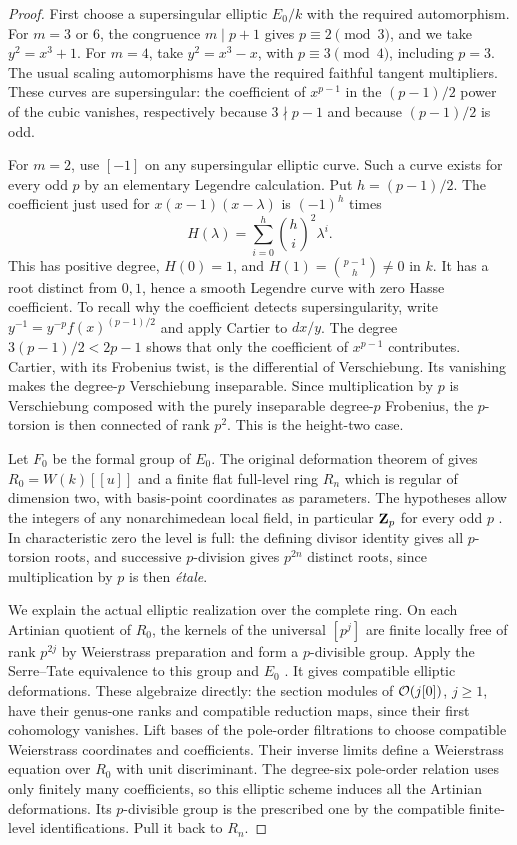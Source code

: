 \begin{proof}
First choose a supersingular elliptic $E_0/k$ with the required automorphism. For $m=3$ or $6$, the congruence $m\mid p+1$ gives $p\equiv2\pmod3$, and we take $y^2=x^3+1$. For $m=4$, take $y^2=x^3-x$, with $p\equiv3\pmod4$, including $p=3$. The usual scaling automorphisms have the required faithful tangent multipliers. These curves are supersingular: the coefficient of $x^{p-1}$ in the $(p-1)/2$ power of the cubic vanishes, respectively because $3\nmid p-1$ and because $(p-1)/2$ is odd.

For $m=2$, use $[-1]$ on any supersingular elliptic curve. Such a curve exists for every odd $p$ by an elementary Legendre calculation. Put $h=(p-1)/2$. The coefficient just used for $x(x-1)(x-\lambda)$ is $(-1)^h$ times
\[
 H(\lambda)=\sum_{i=0}^h\binom hi^2\lambda^i.
\]
This has positive degree, $H(0)=1$, and
$H(1)=\binom{p-1}{h}\ne0$ in $k$. It has a root distinct from $0,1$, hence a smooth Legendre curve with zero Hasse coefficient. To recall why the coefficient detects supersingularity, write
$y^{-1}=y^{-p}f(x)^{(p-1)/2}$ and apply Cartier to $dx/y$. The degree $3(p-1)/2<2p-1$ shows that only the coefficient of $x^{p-1}$ contributes. Cartier, with its Frobenius twist, is the differential of Verschiebung. Its vanishing makes the degree-$p$ Verschiebung inseparable. Since multiplication by $p$ is Verschiebung composed with the purely inseparable degree-$p$ Frobenius, the $p$-torsion is then connected of rank $p^2$. This is the height-two case.

Let $F_0$ be the formal group of $E_0$. The original deformation theorem of \citet[Propositions~4.2--4.3, pp.~570--573]{Drinfeld1974} gives
$R_0=W(k)[[u]]$ and a finite flat full-level ring $R_n$ which is regular of dimension two, with basis-point coordinates as parameters. The hypotheses allow the integers of any nonarchimedean local field, in particular $\mathbf Z_p$ for every odd $p$ \citep[\S1C, pp.~564--565]{Drinfeld1974}. In characteristic zero the level is full: the defining divisor identity gives all $p$-torsion roots, and successive $p$-division gives $p^{2n}$ distinct roots, since multiplication by $p$ is then \emph{\'etale}.

We explain the actual elliptic realization over the complete ring. On each Artinian quotient of $R_0$, the kernels of the universal $[p^j]$ are finite locally free of rank $p^{2j}$ by Weierstrass preparation and form a $p$-divisible group. Apply the Serre--Tate equivalence to this group and $E_0$ \citep[Theorem~1.2.1, p.~143, proof pp.~144--146]{Katz1981}. It gives compatible elliptic deformations. These algebraize directly: the section modules of $\mathcal O(j[0])$, $j\ge1$, have their genus-one ranks and compatible reduction maps, since their first cohomology vanishes. Lift bases of the pole-order filtrations to choose compatible Weierstrass coordinates and coefficients. Their inverse limits define a Weierstrass equation over $R_0$ with unit discriminant. The degree-six pole-order relation uses only finitely many coefficients, so this elliptic scheme induces all the Artinian deformations. Its $p$-divisible group is the prescribed one by the compatible finite-level identifications. Pull it back to $R_n$.


\end{proof}
